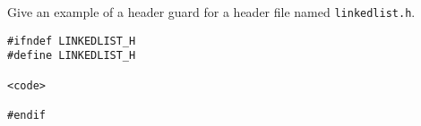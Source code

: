 Give an example of a header guard for a header file named \texttt{linkedlist.h}.

\begin{answer}
\begin{lstlisting}
#ifndef LINKEDLIST_H
#define LINKEDLIST_H

<code>

#endif
\end{lstlisting}
\end{answer}
